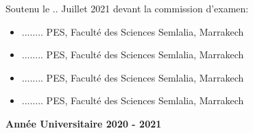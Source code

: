 \begin{titlepage}
\begin{center}
\begin{Large}
   
 
\end{Large}


\vspace{1cm}

{\large }
 
  \end{center}
  \begin{flushleft}
   Soutenu le .. Juillet 2021 devant la commission d'examen:\\
   \begin{itemize}
    \item ........		\hfill PES, Faculté des Sciences Semlalia, Marrakech
    \item ........		\hfill PES, Faculté des Sciences Semlalia, Marrakech
    \item ........		\hfill PES, Faculté des Sciences Semlalia, Marrakech
    \item ........	   \hfill PES, Faculté des Sciences Semlalia, Marrakech
    \end{itemize}
  \end{flushleft}
  \vfill
   \begin{center}
   \textbf{Année Universitaire 2020 - 2021}
  \end{center}
\end{titlepage}